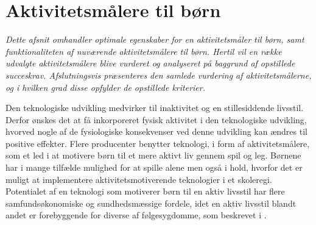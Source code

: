 \section{Aktivitetsmålere til børn} \label{tracker_intro}

\textit{Dette afsnit omhandler optimale egenskaber for en aktivitetsmåler til børn, samt funktionaliteten af nuværende aktivitetsmålere til børn. Hertil vil en række udvalgte aktivitetsmålere blive vurderet og analyseret på baggrund af opstillede succeskrav. Afslutningsvis præsenteres den samlede vurdering af aktivitetsmålerne, og i hvilken grad disse opfylder de opstillede kriterier.}

%



Den teknologiske udvikling medvirker til inaktivitet og en stillesiddende livsstil. Derfor ønskes det at få inkorporeret fysisk aktivitet i den teknologiske udvikling, hvorved nogle af de fysiologiske konsekvenser ved denne udvikling kan ændres til positive effekter. \citep{ObesityActionCoalition} Flere producenter benytter teknologi, i form af aktivitetsmålere, som et led i at motivere børn til et mere aktivt liv gennem spil og leg. Børnene har i mange tilfælde mulighed for at spille alene men også i hold, hvorfor det er muligt at implementere aktivitetsmotiverende teknologier i et skoleregi. \citep{Fuhu2015,PowerAbout2015}
Potentialet af en teknologi som motiverer børn til en aktiv livsstil har flere samfundsøkonomiske og sundhedsmæssige fordele, idet en aktiv livsstil blandt andet er forebyggende for diverse af følgesygdomme, som beskrevet i .


